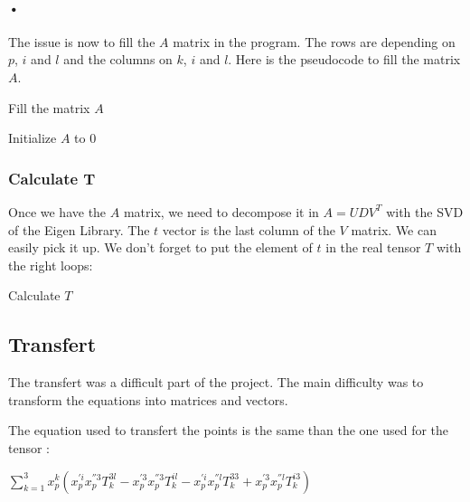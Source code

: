 \documentclass{report}
\begin{document}
\paragraph{•}
The issue is now to fill the $A$ matrix in the program. The rows are depending on $p$, $i$ and $l$ and the columns on $k$, $i$ and $l$. Here is the pseudocode to fill the matrix $A$. 

\begin{algorithm}
\SetLine
\caption{Fill the matrix $A$}
\SetLine
Initialize $A$ to 0

\end{algorithm}

\newpage
\subsubsection{Calculate T}
Once we have the $A$ matrix, we need to decompose it in $A=UDV^{T}$ with the SVD of the Eigen Library. The $t$ vector is the last column of the $V$ matrix. We can easily pick it up. 
We don't forget to put the element of $t$ in the real tensor $T$ with the right loops: 
\begin{algorithm}
\SetLine
\caption{Calculate $T$}
\SetLine
{}
\end{algorithm}



\subsection{Transfert}
The transfert was a difficult part of the project. The main difficulty was to transform the equations into matrices and vectors.

The equation used to transfert the points is the same than the one used for the tensor : 
\begin{center}
 $ \displaystyle { \sum_{k = 1}^{3}} x_{p}^{k}(x_{p}^{'i}x_{p}^{''3}T_{k}^{3l} - x_{p}^{'3}x_{p}^{''3}T_{k}^{il} - x_{p}^{'i}x_{p}^{''l}T_{k}^{33} + x_{p}^{'3}x_{p}^{''l}T_{k}^{i3})$ 
\end{center}
\end{document}
